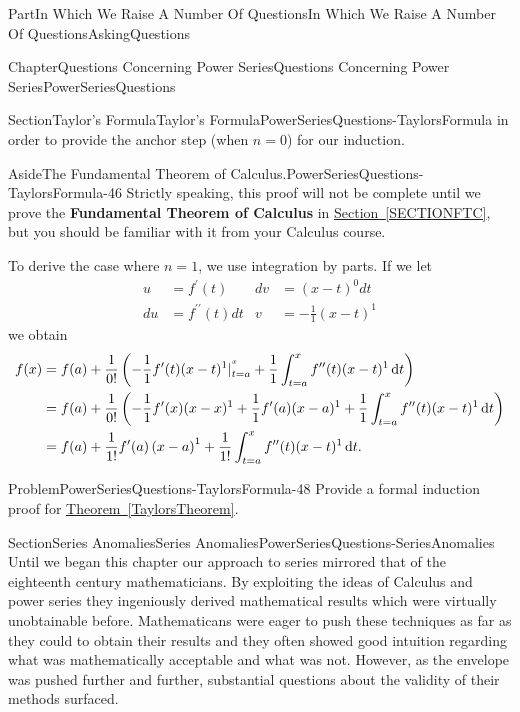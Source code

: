 \documentclass[oneside,10pt,]{book}
\newcommand{\xreffont}{\relax}
\newcommand{\terminology}[1]{\textbf{#1}}
\numberwithin{equation}{part}
\newcommand{\dx}[1]{\,{\rm d}#1}
\newcommand{\amp}{&}
\begin{document}
\begin{partptx}{Part}{In Which We Raise A Number Of Questions}{}{In Which We Raise A Number Of Questions}{}{}{AskingQuestions}
\begin{chapterptx}{Chapter}{Questions Concerning Power Series}{}{Questions Concerning Power Series}{}{}{PowerSeriesQuestions}
\begin{sectionptx}{Section}{Taylor's Formula}{}{Taylor's Formula}{}{}{PowerSeriesQuestions-TaylorsFormula}
in order to provide the anchor step (when \(n=0\)) for our induction.%
\begin{aside}{Aside}{The Fundamental Theorem of Calculus.}{PowerSeriesQuestions-TaylorsFormula-46}%
Strictly speaking, this proof will not be complete until we prove the \terminology{Fundamental Theorem of Calculus} in \hyperref[SECTIONFTC]{Section~{\xreffont\ref{SECTIONFTC}}}, but you should be familiar with it from your Calculus course.%
\end{aside}
To derive the case where \(n=1\), we use integration by parts. If we let%
\begin{align*}
u\amp =f^\prime(t)\amp  d v\amp =(x-t)^0d t\\
d u\amp =f^{\prime\prime}(t)d t\amp  v\amp =-\frac{1}{1}(x-t)^1
\end{align*}
we obtain%
\begin{align*}
f(x)\amp =f(a)+\frac{1}{0!}\left(-\frac{1}{1}f^\prime(t)(x-t)^1|_{t=a}^{^x}+\frac{1}{1} \int_{t=a}^xf^{\prime\prime}(t)(x-t)^1\dx{ t}\right)\\
\amp =f(a)+\frac{1}{0!}\left(-\frac{1}{1}f^\prime(x)(x-x)^1+ \frac{1}{1}f^\prime(a)(x-a)^1+\frac{1}{1}\int_{t=a}^xf^{\prime\prime}(t)(x-t)^1\dx{ t}\right)\\
\amp =f(a)+\frac{1}{1!}f^\prime(a)\left(x-a\right)^1 + \frac{1}{1!}\int_{t=a}^xf^{\prime\prime}(t)(x-t)^1\dx{ t}\text{.}
\end{align*}
%
\begin{problem}{Problem}{}{PowerSeriesQuestions-TaylorsFormula-48}%
Provide a formal induction proof for \hyperref[TaylorsTheorem]{Theorem~{\xreffont\ref{TaylorsTheorem}}}.%
\end{problem}
\end{sectionptx}
%
%
\typeout{************************************************}
\typeout{************************************************}
%
\begin{sectionptx}{Section}{Series Anomalies}{}{Series Anomalies}{}{}{PowerSeriesQuestions-SeriesAnomalies}
Until we began this chapter our approach to series mirrored that of the eighteenth century mathematicians. By exploiting the ideas of Calculus and power series they ingeniously derived mathematical results which were virtually unobtainable before. Mathematicans were eager to push these techniques as far as they could to obtain their results and they often showed good intuition regarding what was mathematically acceptable and what was not.  However, as the envelope was pushed further and further, substantial questions about the validity of their methods surfaced.%

\end{sectionptx}
\end{chapterptx}
\end{partptx}
\end{document}
